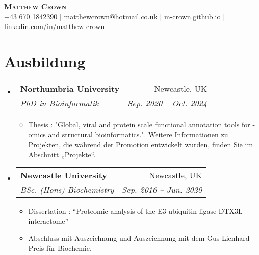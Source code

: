 \documentclass[a4paper,11pt]{article}
\makeatletter
\newcommand{\resumeItem}[1]{
  \item\small{
    {#1 \vspace{-2pt}}
  }
}
\newcommand{\resumeSubheading}[4]{
  \vspace{-2pt}\item
    \begin{tabular*}{0.97\textwidth}[t]{l@{\extracolsep{\fill}}r}
      \textbf{#1} & #2 \\
      \textit{\small#3} & \textit{\small #4} \\
    \end{tabular*}\vspace{-7pt}
}
\newcommand{\resumeSubHeadingListStart}{\begin{itemize}[leftmargin=0.15in, label={}]}
\newcommand{\resumeSubHeadingListEnd}{\end{itemize}}
\newcommand{\resumeItemListStart}{\begin{itemize}}
\newcommand{\resumeItemListEnd}{\end{itemize}\vspace{-5pt}}
\makeatother
\begin{document}

\begin{center}
    \textbf{\Huge \scshape Matthew Crown} \\ \vspace{4pt}
    \small +43 670 1842390 $|$ \href{mailto:matthewcrown@hotmail.co.uk}{\underline{matthewcrown@hotmail.co.uk}} $|$ 
    \href{https://m-crown.github.io}{\underline{m-crown.github.io}} $|$
    \href{https://linkedin.com/in/matthew-crown}{\underline{linkedin.com/in/matthew-crown}}
\end{center}


\section{Ausbildung}
  \resumeSubHeadingListStart
    \resumeSubheading
      {Northumbria University}{Newcastle, UK}
      {PhD in Bioinformatik}{Sep. 2020 -- Oct. 2024}
      \resumeItemListStart
        \resumeItem{Thesis : "Global, viral and protein scale functional annotation tools for -omics and structural bioinformatics.". Weitere Informationen zu Projekten, die während der Promotion entwickelt wurden, finden Sie im Abschnitt „Projekte“.}
      \resumeItemListEnd
    \resumeSubheading
      {Newcastle University}{Newcastle, UK}
      {BSc. (Hons) Biochemistry}{Sep. 2016 -- Jun. 2020}
      \resumeItemListStart
        \resumeItem{Dissertation : “Proteomic analysis of the E3-ubiquitin ligase
        DTX3L interactome”}
        \resumeItem{Abschluss mit Auszeichnung und Auszeichnung mit dem Gus-Lienhard-Preis für Biochemie.}
      \resumeItemListEnd
  \resumeSubHeadingListEnd


\end{document}
